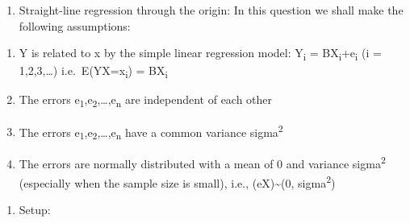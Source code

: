 \documentclass[
]{article}
\providecommand{\tightlist}{%
  \setlength{\itemsep}{0pt}\setlength{\parskip}{0pt}}
\begin{document}
\begin{enumerate}
\def\labelenumi{\arabic{enumi}.}
\setcounter{enumi}{3}
\tightlist
\item
  Straight-line regression through the origin: In this question we shall
  make the following assumptions:
\end{enumerate}

\begin{enumerate}
\def\labelenumi{(\arabic{enumi})}
\tightlist
\item
  Y is related to x by the simple linear regression model:
  Y\textsubscript{i} = BX\textsubscript{i}+e\textsubscript{i} (i =
  1,2,3,\ldots) i.e.~E(Y\textbar X=x\textsubscript{i}) =
  BX\textsubscript{i}
\item
  The errors
  e\textsubscript{1},e\textsubscript{2},\ldots,e\textsubscript{n} are
  independent of each other
\item
  The errors
  e\textsubscript{1},e\textsubscript{2},\ldots,e\textsubscript{n} have a
  common variance sigma\textsuperscript{2}
\item
  The errors are normally distributed with a mean of 0 and variance
  sigma\textsuperscript{2} (especially when the sample size is small),
  i.e., (e\textbar X)\textasciitilde{}\N(0, sigma\textsuperscript{2})
\end{enumerate}

\begin{enumerate}
\def\labelenumi{(\alph{enumi})}
\tightlist
\item
  Setup:
\end{enumerate}
\end{document}
